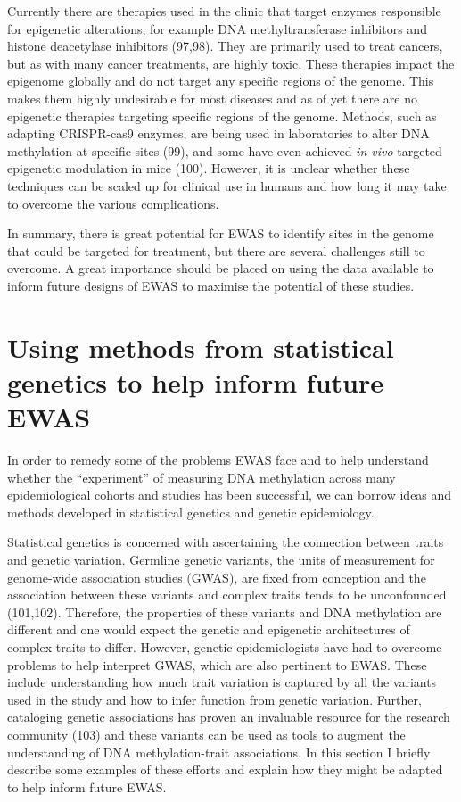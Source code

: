\documentclass[11pt,twoside]{bristolthesis}
\begin{document}
Currently there are therapies used in the clinic that target enzymes responsible for epigenetic alterations, for example DNA methyltransferase inhibitors and histone deacetylase inhibitors (97,98). They are primarily used to treat cancers, but as with many cancer treatments, are highly toxic. These therapies impact the epigenome globally and do not target any specific regions of the genome. This makes them highly undesirable for most diseases and as of yet there are no epigenetic therapies targeting specific regions of the genome. Methods, such as adapting CRISPR-cas9 enzymes, are being used in laboratories to alter DNA methylation at specific sites (99), and some have even achieved \emph{in vivo} targeted epigenetic modulation in mice (100). However, it is unclear whether these techniques can be scaled up for clinical use in humans and how long it may take to overcome the various complications.

In summary, there is great potential for EWAS to identify sites in the genome that could be targeted for treatment, but there are several challenges still to overcome. A great importance should be placed on using the data available to inform future designs of EWAS to maximise the potential of these studies.

\hypertarget{genetics-in-ewas}{%
\section{Using methods from statistical genetics to help inform future EWAS}\label{genetics-in-ewas}}

In order to remedy some of the problems EWAS face and to help understand whether the ``experiment'' of measuring DNA methylation across many epidemiological cohorts and studies has been successful, we can borrow ideas and methods developed in statistical genetics and genetic epidemiology.

Statistical genetics is concerned with ascertaining the connection between traits and genetic variation. Germline genetic variants, the units of measurement for genome-wide association studies (GWAS), are fixed from conception and the association between these variants and complex traits tends to be unconfounded (101,102). Therefore, the properties of these variants and DNA methylation are different and one would expect the genetic and epigenetic architectures of complex traits to differ. However, genetic epidemiologists have had to overcome problems to help interpret GWAS, which are also pertinent to EWAS. These include understanding how much trait variation is captured by all the variants used in the study and how to infer function from genetic variation. Further, cataloging genetic associations has proven an invaluable resource for the research community (103) and these variants can be used as tools to augment the understanding of DNA methylation-trait associations. In this section I briefly describe some examples of these efforts and explain how they might be adapted to help inform future EWAS.
\end{document}
